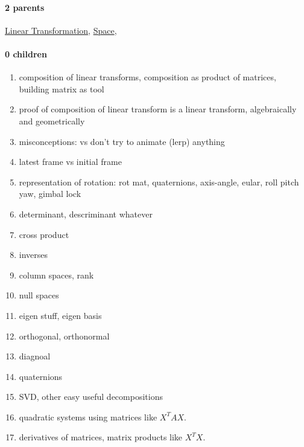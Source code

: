 \documentclass[../main.tex]{subfiles}
\begin{document}
\paragraph{2 parents} \hyperref[statement:Linear Transformation]{Linear Transformation}, \hyperref[statement:Space]{Space}, 
\paragraph{0 children} 



\todo
\begin{enumerate}[nolistsep]
  \item composition of linear transforms, composition as product of matrices, building matrix as tool
  \item proof of composition of linear transform is a linear transform, algebraically and geometrically
  \item misconceptions:  vs  don't try to animate (lerp) anything
  \item latest frame vs initial frame
  \item representation of rotation: rot mat, quaternions, axis-angle, eular, roll pitch yaw, gimbal lock
  \item determinant, descriminant whatever
  \item cross product
  \item inverses
  \item column spaces, rank
  \item null spaces
  \item eigen stuff, eigen basis
  \item orthogonal, orthonormal
  \item diagnoal
  \item quaternions
  \item SVD, other easy useful decompositions
  \item quadratic systems using matrices like $X^TAX$.
  \item derivatives of matrices, matrix products like $X^T X$.
\end{enumerate}
\end{document}
